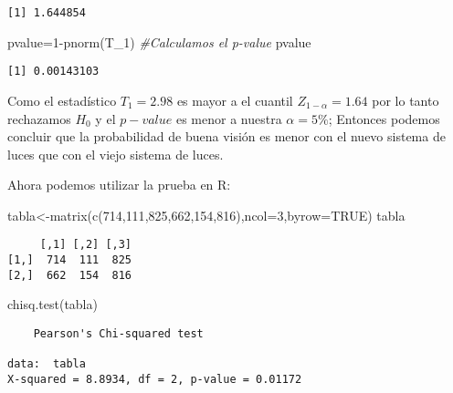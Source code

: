 \documentclass[
  a4paper,
  oneside,
  openany]{book}
\newenvironment{Shaded}{\begin{snugshade}}{\end{snugshade}}
\newcommand{\AttributeTok}[1]{\textcolor[rgb]{0.77,0.63,0.00}{#1}}
\newcommand{\CommentTok}[1]{\textcolor[rgb]{0.56,0.35,0.01}{\textit{#1}}}
\newcommand{\ConstantTok}[1]{\textcolor[rgb]{0.00,0.00,0.00}{#1}}
\newcommand{\DecValTok}[1]{\textcolor[rgb]{0.00,0.00,0.81}{#1}}
\newcommand{\FunctionTok}[1]{\textcolor[rgb]{0.00,0.00,0.00}{#1}}
\newcommand{\NormalTok}[1]{#1}
\newcommand{\OtherTok}[1]{\textcolor[rgb]{0.56,0.35,0.01}{#1}}
\newcommand{\SpecialCharTok}[1]{\textcolor[rgb]{0.00,0.00,0.00}{#1}}
\begin{document}
\begin{verbatim}
[1] 1.644854
\end{verbatim}

\begin{Shaded}
\begin{Highlighting}[]
\NormalTok{pvalue}\OtherTok{=}\DecValTok{1}\SpecialCharTok{{-}}\FunctionTok{pnorm}\NormalTok{(T\_1)  }\CommentTok{\#Calculamos el p{-}value}
\NormalTok{pvalue}
\end{Highlighting}
\end{Shaded}

\begin{verbatim}
[1] 0.00143103
\end{verbatim}

Como el estadístico \(T_1=2.98\) es mayor a el cuantil \(Z_{1-\alpha}=1.64\) por lo tanto rechazamos \(H_0\)
y el \(p-value\) es menor a nuestra \(\alpha=5\%\); Entonces podemos concluir que la probabilidad de buena visión es menor con el nuevo sistema de luces que con el viejo sistema de luces.

Ahora podemos utilizar la prueba en R:

\begin{Shaded}
\begin{Highlighting}[]
\NormalTok{tabla}\OtherTok{\textless{}{-}}\FunctionTok{matrix}\NormalTok{(}\FunctionTok{c}\NormalTok{(}\DecValTok{714}\NormalTok{,}\DecValTok{111}\NormalTok{,}\DecValTok{825}\NormalTok{,}\DecValTok{662}\NormalTok{,}\DecValTok{154}\NormalTok{,}\DecValTok{816}\NormalTok{),}\AttributeTok{ncol=}\DecValTok{3}\NormalTok{,}\AttributeTok{byrow=}\ConstantTok{TRUE}\NormalTok{)}
\NormalTok{tabla}
\end{Highlighting}
\end{Shaded}

\begin{verbatim}
     [,1] [,2] [,3]
[1,]  714  111  825
[2,]  662  154  816
\end{verbatim}

\begin{Shaded}
\begin{Highlighting}[]
\FunctionTok{chisq.test}\NormalTok{(tabla)}
\end{Highlighting}
\end{Shaded}

\begin{verbatim}
    Pearson's Chi-squared test

data:  tabla
X-squared = 8.8934, df = 2, p-value = 0.01172
\end{verbatim}
\end{document}
